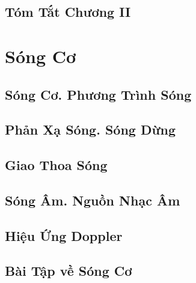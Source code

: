 \documentclass{article}
\numberwithin{equation}{section}
\begin{document}

\subsection{Tóm Tắt Chương II}


\section{Sóng Cơ}

\subsection{Sóng Cơ. Phương Trình Sóng}


\subsection{Phản Xạ Sóng. Sóng Dừng}


\subsection{Giao Thoa Sóng}


\subsection{Sóng Âm. Nguồn Nhạc Âm}


\subsection{Hiệu Ứng Doppler}


\subsection{Bài Tập về Sóng Cơ}
\end{document}
